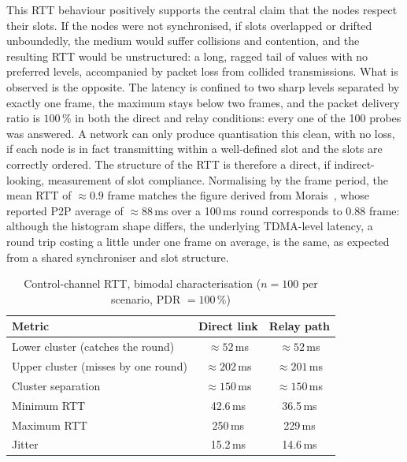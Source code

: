 This RTT behaviour positively supports the central claim that the nodes
respect their slots. If the nodes were not synchronised, if slots overlapped or
drifted unboundedly, the medium would suffer collisions and contention, and
the resulting RTT would be unstructured: a long, ragged tail of values with no
preferred levels, accompanied by packet loss from collided transmissions.
What is observed is the opposite. The latency is confined to two sharp levels
separated by exactly one frame, the maximum stays below two frames, and the
packet delivery ratio is $100\,\%$ in both the direct and relay conditions:
every one of the 100 probes was answered. A network can only produce
quantisation this clean, with no loss, if each node is in fact transmitting
within a well-defined slot and the slots are correctly ordered. The structure
of the RTT is therefore a direct, if indirect-looking, measurement of slot
compliance. Normalising by the frame period, the mean RTT of $\approx 0.9$
frame matches the figure derived from Morais~\cite{morais2024synchronization},
whose reported P2P average of $\approx 88$\,ms over a 100\,ms round corresponds
to 0.88 frame: although the histogram shape differs, the underlying
TDMA-level latency, a round trip costing a little under one frame on average,  is the same, as expected from a shared synchroniser and slot structure.

\begin{table}[h]
\centering
\caption{Control-channel RTT, bimodal characterisation
($n = 100$ per scenario, PDR $= 100\,\%$)}
\label{tab:rtt}
\begin{tabular}{lcc}
\toprule
\textbf{Metric} & \textbf{Direct link} & \textbf{Relay path} \\
\midrule
Lower cluster (catches the round)   & $\approx 52$\,ms  & $\approx 52$\,ms  \\
Upper cluster (misses by one round) & $\approx 202$\,ms & $\approx 201$\,ms \\
Cluster separation                  & $\approx 150$\,ms & $\approx 150$\,ms \\
Minimum RTT                         & 42.6\,ms          & 36.5\,ms          \\
Maximum RTT                         & 250\,ms           & 229\,ms           \\
Jitter                              & 15.2\,ms          & 14.6\,ms          \\
\bottomrule
\end{tabular}
\end{table}


